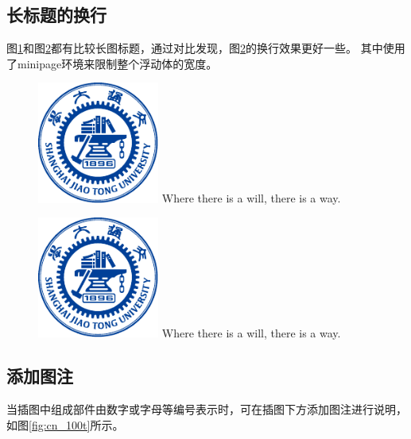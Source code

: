 \documentclass[doctor,openright,twoside]{sjtuthesis}
\theoremstyle{plain}
\theoremstyle{definition}
\theoremstyle{remark}
\theoremstyle{ocrenumbox}
\theoremstyle{plain}
\begin{document}
\subsection{长标题的换行}
\label{sec:longcaption}

图\ref{fig:longcaptionbad}和图\ref{fig:longcaptiongood}都有比较长图标题，通过对比发现，图\ref{fig:longcaptiongood}的换行效果更好一些。
其中使用了minipage环境来限制整个浮动体的宽度。

\begin{figure}[!htp]
  \centering
  \includegraphics[width=4cm]{sjtubadge.pdf}
    {Where there is a will, there is a way.}
 \label{fig:longcaptionbad}
\end{figure}

\begin{figure}[!htbp]
  \centering
  \begin{minipage}[b]{0.6\textwidth}
    \centering
    \includegraphics[width=4cm]{sjtubadge.pdf}
      {Where there is a will, there is a way.}
    \label{fig:longcaptiongood}
  \end{minipage}
\end{figure}

\subsection{添加图注}

当插图中组成部件由数字或字母等编号表示时，可在插图下方添加图注进行说明，如图\ref{fig:cn_100t}所示。
\end{document}
